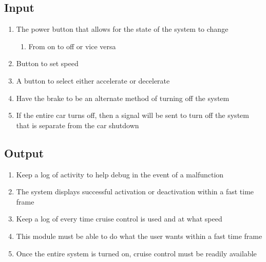 \documentclass[preprint,11pt,3p]{article}
\begin{document}
\subsection{Input}
\begin{enumerate}
	\item The power button that allows for the state of the system to change
		\begin{enumerate}
			\item From on to off or vice versa
		\end{enumerate}
	\item Button to set speed
	\item A button to select either accelerate or decelerate
	\item Have the brake to be an alternate method of turning off the system
	\item If the entire car turns off, then a signal will be sent to turn off the system that is separate from the car shutdown
\end{enumerate}

\subsection{Output}
\begin{enumerate}
	\item Keep a log of activity to help debug in the event of a malfunction
	\item The system displays successful activation or deactivation within a fast time frame
	\item Keep a log of every time cruise control is used and at what speed
	\item This module must be able to do what the user wants within a fast time frame
	\item Once the entire system is turned on, cruise control must be readily available
\end{enumerate}
\end{document}
